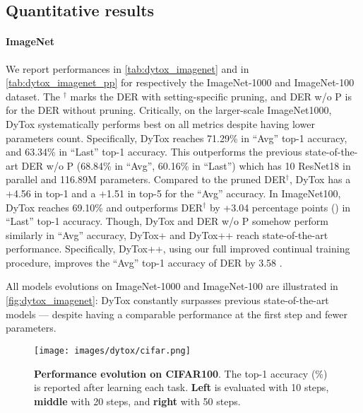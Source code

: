 \subsection{Quantitative results}

\paragraph{ImageNet}
We report performances in \autoref{tab:dytox_imagenet} and in \autoref{tab:dytox_imagenet_pp} for
respectively the ImageNet-1000 and ImageNet-100 dataset. The $^\dagger$
marks the DER with setting-specific pruning, and DER w/o P is for the DER without pruning.
Critically, on the larger-scale ImageNet1000, DyTox systematically performs best on all
metrics despite having lower parameters count. Specifically, DyTox reaches 71.29\% in ``Avg'' top-1
accuracy, and 63.34\% in ``Last'' top-1 accuracy. This outperforms the previous state-of-the-art DER
w/o P (68.84\% in ``Avg'', 60.16\% in ``Last'') which has 10 ResNet18 in parallel and 116.89M
parameters. Compared to the pruned DER$^\dagger$, DyTox has a +4.56 \pp in top-1 and a +1.51 \pp in
top-5 for the ``Avg'' accuracy. In ImageNet100, DyTox reaches 69.10\% and outperforms DER$^\dagger$ by +3.04 percentage points (\pp) in
``Last'' top-1 accuracy. Though, DyTox and DER w/o P somehow perform similarly in ``Avg'' accuracy,
DyTox+ and DyTox++ reach state-of-the-art performance. Specifically, DyTox++, using our full
improved continual training procedure, improves the ``Avg'' top-1 accuracy of DER by 3.58 \pp.

All models evolutions on ImageNet-1000 and ImageNet-100 are illustrated in
\autoref{fig:dytox_imagenet}: DyTox constantly surpasses previous state-of-the-art models --- despite
having a comparable performance at the first step and fewer parameters.



\begin{figure*}[t!]
    \centering
    \texttt{[image: images/dytox/cifar.png]}
    \caption{\textbf{Performance evolution on CIFAR100}. The top-1 accuracy (\%) is reported after
        learning each task. \textbf{Left} is evaluated with 10 steps, \textbf{middle} with 20 steps, and
        \textbf{right} with 50 steps.}
    \label{fig:dytox_increment_cifar}
\end{figure*}


